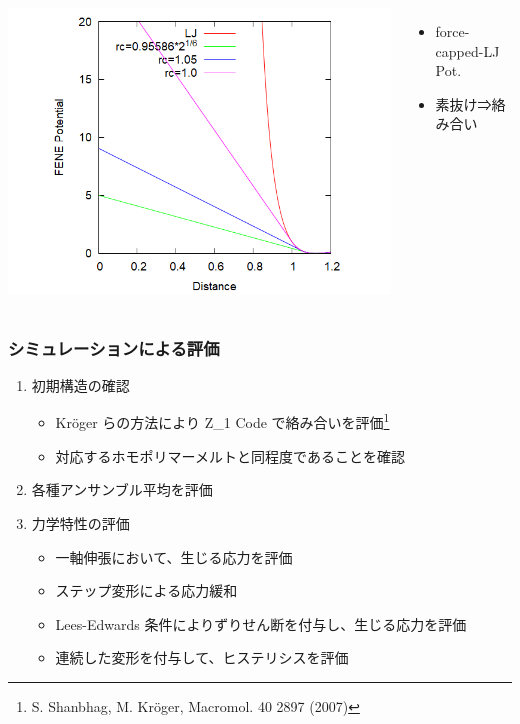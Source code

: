 \documentclass[12pt, dvipdfmx]{beamer}
\begin{document}
\begin{frame}
\begin{columns}[T, onlytextwidth]
\begin{center}
					\includegraphics[width=1.2\textwidth]{Ev_fcLJ.png}
				\end{center}
				\vspace{-3mm}
				\scriptsize
				\begin{itemize}
					\item force-capped-LJ Pot.
					\item 素抜け⇒絡み合い
				\end{itemize}
		\end{columns}
\end{frame}

\begin{frame}
	\frametitle{シミュレーションによる評価}
	\begin{enumerate}
		\item 初期構造の確認
			\begin{itemize}
				\item Kr\"{o}ger らの方法により Z\_1 Code で絡み合いを評価\footnote[1]{
					S. Shanbhag, M. Kr\"{o}ger, Macromol. 40 2897 (2007)
				}
				\item 対応するホモポリマーメルトと同程度であることを確認
			\end{itemize}
		\item 各種アンサンブル平均を評価
		\item 力学特性の評価
			\begin{itemize}
				\item 一軸伸張において、生じる応力を評価
				\item ステップ変形による応力緩和
				\item Lees-Edwards 条件によりずりせん断を付与し、生じる応力を評価
				\item 連続した変形を付与して、ヒステリシスを評価
			\end{itemize}	
	\end{enumerate}
\end{frame}
\end{document}
